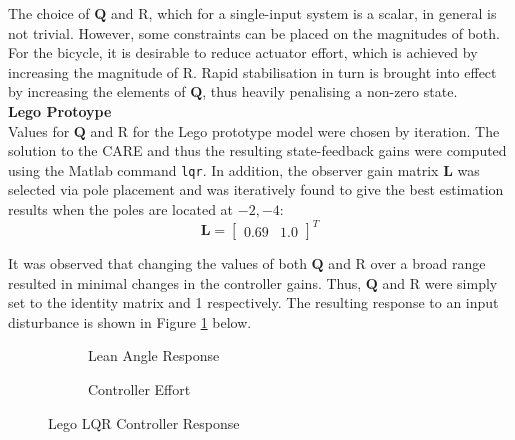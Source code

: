 The choice of $\mathbf{Q}$ and R, which for a single-input system is a scalar, in general is not trivial. However, some constraints can be placed on the magnitudes of both. For the bicycle, it is desirable to reduce actuator effort, which is achieved by increasing the magnitude of R. Rapid stabilisation in turn is brought into effect by increasing the elements of $\mathbf{Q}$, thus heavily penalising a non-zero state. \\

\textbf{Lego Protoype} \\
Values for $\mathbf{Q}$ and R for the Lego prototype model were chosen by iteration. The solution to the CARE and thus the resulting state-feedback gains were computed using the Matlab command \texttt{lqr}. In addition, the observer gain matrix $\mathbf{L}$ was selected via pole placement and was iteratively found to give the best estimation results when the poles are located at $-2,-4$:
\begin{equation*}
\mathbf{L} = \begin{bmatrix}
0.69 & 1.0
\end{bmatrix}^T
\end{equation*}

It was observed that changing the values of both $\mathbf{Q}$ and R over a broad range resulted in minimal changes in the controller gains. Thus, $\mathbf{Q}$ and R were simply set to the identity matrix and 1 respectively. The resulting response to an input disturbance is shown in Figure \ref{fig:lqrLego} below.

\begin{figure}[H]
	\begin{subfigure}{0.5\textwidth}
	\caption{Lean Angle Response}
	\end{subfigure} \hspace{1mm}
	\begin{subfigure}{0.5\textwidth}
	\caption{Controller Effort}
	\end{subfigure}
	\caption{Lego LQR Controller Response}
	\label{fig:lqrLego}
\end{figure}

